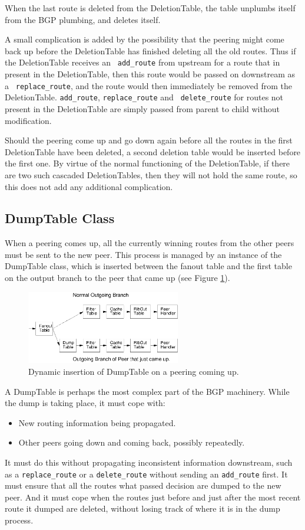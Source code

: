 \documentclass[11pt]{article}
\begin{document}
When the last route is deleted from the DeletionTable, the table
unplumbs itself from the BGP plumbing, and deletes itself.

A small complication is added by the possibility that the peering
might come back up before the DeletionTable has finished deleting all
the old routes.  Thus if the DeletionTable receives an {\tt
add\_route} from upstream for a route that in present in the
DeletionTable, then this route would be passed on downstream as a {\tt
replace\_route}, and the route would then immediately be removed from
the DeletionTable.  {\tt add\_route}, {\tt replace\_route} and {\tt
delete\_route} for routes not present in the DeletionTable are simply
passed from parent to child without modification.

Should the peering come up and go down again before all the routes in
the first DeletionTable have been deleted, a second deletion table
would be inserted before the first one.  By virtue of the normal
functioning of the DeletionTable, if there are two such cascaded
DeletionTables, then they will not hold the same route, so this does
not add any additional complication.

\subsection{DumpTable Class}

When a peering comes up, all the currently winning routes from the
other peers must be sent to the new peer.  This process is managed by
an instance of the DumpTable class, which is inserted between the
fanout table and the first table on the output branch to the peer that
came up (see Figure \ref{dump_table}).
\begin{figure}[htb]
\centerline{\includegraphics[width=0.6\textwidth]{figs/dump_table}}
\vspace{.05in}
\caption{\label{dump_table}Dynamic insertion of DumpTable on
a peering coming up.}
\end{figure}

A DumpTable is perhaps the most complex part of the BGP machinery.
While the dump is taking place, it must cope with:
\begin{itemize}
\item New routing information being propagated.
\item Other peers going down and coming back, possibly repeatedly.
\end{itemize}
It must do this without propagating inconsistent information downstream,
such as a {\tt replace\_route} or a {\tt delete\_route} without
sending an {\tt add\_route} first.  It must ensure that all the routes
what passed decision are dumped to the new peer. And it must cope when
the routes just before and just after the most recent route it dumped
are deleted, without losing track of where it is in the dump process.
\end{document}
